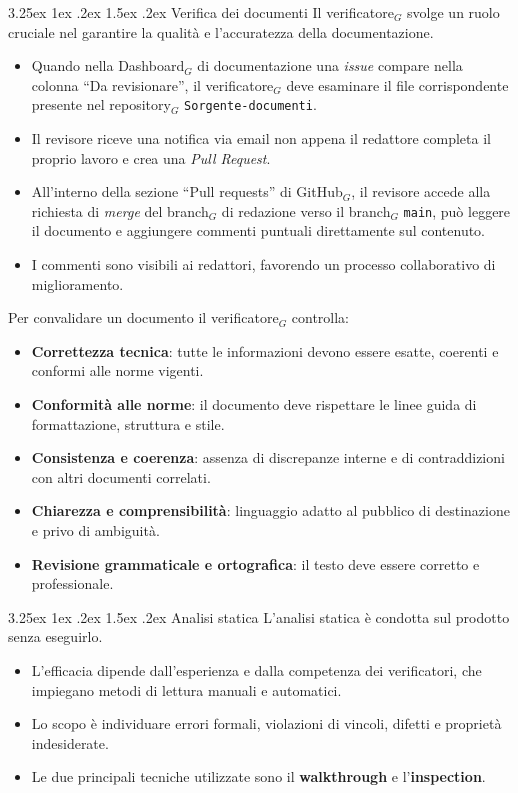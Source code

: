 \documentclass[a4paper, 10pt]{article}
\makeatletter
\renewcommand\paragraph{\@startsection{paragraph}{4}{\z@}%
  {3.25ex \@plus1ex \@minus .2ex}%
  {1.5ex \@plus .2ex}%
  {\normalfont\normalsize\bfseries}}
\makeatother
\begin{document}
\paragraph{Verifica dei documenti}
Il verificatore$_G$ svolge un ruolo cruciale nel garantire la qualità e l'accuratezza della documentazione.
\begin{itemize}
    \item Quando nella Dashboard$_G$ di documentazione una \emph{issue} compare nella colonna ``Da revisionare'', il verificatore$_G$ deve esaminare il file corrispondente presente nel repository$_G$ \texttt{Sorgente-documenti}.
    \item Il revisore riceve una notifica via email non appena il redattore completa il proprio lavoro e crea una \emph{Pull Request}.
    \item All'interno della sezione ``Pull requests'' di GitHub$_G$, il revisore accede alla richiesta di \emph{merge} del branch$_G$ di redazione verso il branch$_G$ \texttt{main}, può leggere il documento e aggiungere commenti puntuali direttamente sul contenuto.
    \item I commenti sono visibili ai redattori, favorendo un processo collaborativo di miglioramento.
\end{itemize}

Per convalidare un documento il verificatore$_G$ controlla:
\begin{itemize}
    \item \textbf{Correttezza tecnica}: tutte le informazioni devono essere esatte, coerenti e conformi alle norme vigenti.
    \item \textbf{Conformità alle norme}: il documento deve rispettare le linee guida di formattazione, struttura e stile.
    \item \textbf{Consistenza e coerenza}: assenza di discrepanze interne e di contraddizioni con altri documenti correlati.
    \item \textbf{Chiarezza e comprensibilità}: linguaggio adatto al pubblico di destinazione e privo di ambiguità.
    \item \textbf{Revisione grammaticale e ortografica}: il testo deve essere corretto e professionale.
\end{itemize}

\paragraph{Analisi statica}
L'analisi statica è condotta sul prodotto senza eseguirlo.
\begin{itemize}
    \item L'efficacia dipende dall'esperienza e dalla competenza dei verificatori, che impiegano metodi di lettura manuali e automatici.
    \item Lo scopo è individuare errori formali, violazioni di vincoli, difetti e proprietà indesiderate.
    \item Le due principali tecniche utilizzate sono il \textbf{walkthrough} e l'\textbf{inspection}.
\end{itemize}
\end{document}
